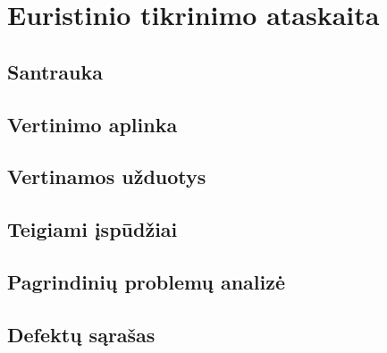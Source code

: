 \section{Euristinio tikrinimo ataskaita}

\subsection{Santrauka}
	
\subsection{Vertinimo aplinka}
	
\subsection{Vertinamos užduotys}
	
\subsection{Teigiami įspūdžiai}
	
\subsection{Pagrindinių problemų analizė}
	
\subsection{Defektų sąrašas}
	
